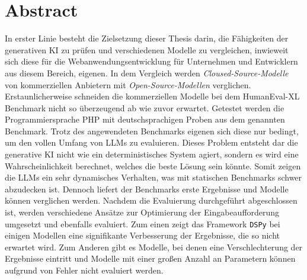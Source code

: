 \chapter{Abstract}
In erster Linie besteht die Zielsetzung dieser Thesis darin, die Fähigkeiten der generativen KI zu prüfen und verschiedenen Modelle zu vergleichen, inwieweit sich diese für die Webanwendungsentwicklung für Unternehmen und Entwicklern aus diesem Bereich, eigenen. In dem Vergleich werden \textit{Cloused-Source-Modelle} von kommerziellen Anbietern mit \textit{Open-Source-Modellen} verglichen. Erstaunlicherweise schneiden die kommerziellen Modelle bei dem HumanEval-XL Benchmark nicht so überzeugend ab wie zuvor erwartet. Getestet werden die Programmiersprache PHP mit deutschsprachigen Proben aus dem genannten Benchmark. Trotz des angewendeten Benchmarks eigenen sich diese nur bedingt, um den vollen Umfang von LLMs zu evaluieren. Dieses Problem entsteht dar die generative KI nicht wie ein deterministisches System agiert, sondern es wird eine Wahrscheinlichkeit berechnet, welches die beste Lösung sein könnte. Somit zeigen die LLMs ein sehr dynamisches Verhalten, was mit statischen Benchmarks schwer abzudecken ist. Dennoch liefert der Benchmarks erste Ergebnisse und Modelle können verglichen werden. Nachdem die Evaluierung durchgeführt abgeschlossen ist, werden verschiedene Ansätze zur Optimierung der Eingabeaufforderung umgesetzt und ebenfalls evaluiert. Zum einen zeigt das Framework \texttt{DSPy} bei einigen Modellen eine signifikante Verbesserung der Ergebnisse, die so nicht erwartet wird. Zum Anderen gibt es Modelle, bei denen eine Verschlechterung der Ergebnisse eintritt und Modelle mit einer großen Anzahl an Parametern können aufgrund von Fehler nicht evaluiert werden.

